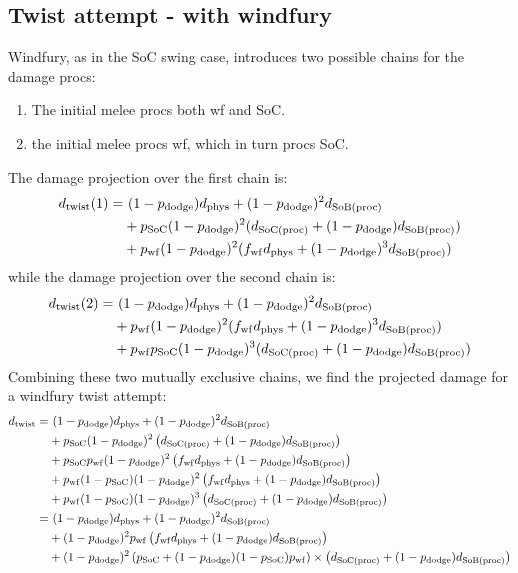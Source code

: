 \subsection{Twist attempt - with windfury}
Windfury, as in the SoC swing case, introduces two possible chains for the damage procs:
\begin{enumerate}
	\item The initial melee procs both wf and SoC.
	\item the initial melee procs wf, which in turn procs SoC.
\end{enumerate}
The damage projection over the first chain is:
\begin{equation*}
	\begin{aligned}
		\dtwist (1) =&~ (1 - \pdodge) \dphys + (1-\pdodge)^2 \dsobproc \\
		&+ \psoc (1-\pdodge)^2 (\dsocproc + (1-\pdodge) \dsobproc) \\
		&+ \pwf (1-\pdodge)^2 (\fwf \dphys + (1-\pdodge)^3 \dsobproc) 
	\end{aligned}
\end{equation*}
while the damage projection over the second chain is:
\begin{equation*}
	\begin{aligned}
		\dtwist (2) =&~ (1 - \pdodge) \dphys + (1-\pdodge)^2 \dsobproc \\
		&+ \pwf (1-\pdodge)^2 (\fwf \dphys + (1-\pdodge)^3 \dsobproc) \\
		&+  \pwf \psoc (1-\pdodge)^3 (\dsocproc + (1-\pdodge) \dsobproc) \\
	\end{aligned}
\end{equation*}
Combining these two mutually exclusive chains, we find the projected damage for a windfury twist attempt:
\begin{equation*}
	\begin{aligned}
		\dtwist =&~ (1 - \pdodge) \dphys + (1-\pdodge)^2 \dsobproc \\
		&+ \psoc (1-\pdodge)^2 \left( \dsocproc + (1-\pdodge) \dsobproc \right) \\
		&+ \psoc\pwf (1-\pdodge)^2 \left(\fwf \dphys + (1-\pdodge) \dsobproc \right) \\
		&+ \pwf (1-\psoc) (1-\pdodge)^2 \left(\fwf \dphys + (1-\pdodge) \dsobproc \right) \\
		&+ \pwf(1-\psoc)(1-\pdodge)^3 \left( \dsocproc + (1-\pdodge) \dsobproc \right) \\
		=&~ (1 - \pdodge) \dphys + (1-\pdodge)^2 \dsobproc \\ 
		&+ (1-\pdodge)^2 \pwf \left( \fwf \dphys + (1 - \pdodge) \dsobproc \right) \\ 
		&+ (1-\pdodge)^2  \left( \psoc + (1-\pdodge)(1-\psoc)\pwf \right) \times \left( \dsocproc + (1-\pdodge)\dsobproc \right)
	\end{aligned}
\end{equation*}


